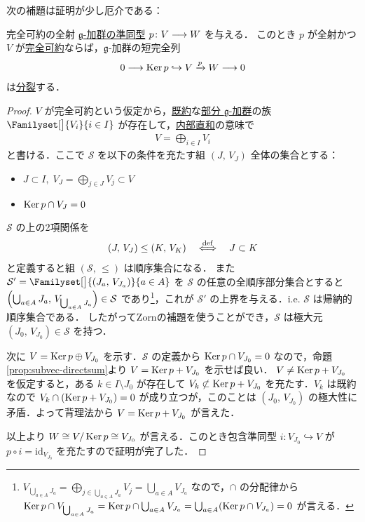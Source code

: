 \documentclass[rep_main]{subfiles}
\begin{document}
次の補題は証明が少し厄介である：
\begin{mylem}[label=lem:semisimple-split]{完全可約の全射}
	\hyperref[def:g-module-hom]{$\mathfrak{g}$-加群の準同型} $p \colon V \longrightarrow W$ を与える．
	このとき $p$ が全射かつ $V$ が\hyperref[def:irr]{完全可約}ならば，$\mathfrak{g}$-加群の短完全列
	\begin{align}
		0 \longrightarrow \operatorname{Ker} p \hookrightarrow V \xrightarrow{p} W \longrightarrow 0
	\end{align}
	は\hyperref[lem:splitting]{分裂}する．
\end{mylem}

\begin{proof}
	$V$ が完全可約という仮定から，\hyperref[def:irr]{既約}な\hyperref[def:sub-g-module]{部分 $\mathfrak{g}$-加群}の族 $\Familyset[\big]{V_i}{i \in I}$ が存在して，\hyperref[col:subvec-directsum]{内部直和}の意味で
	\begin{align}
		V = \bigoplus_{i \in I} V_i
	\end{align}
	と書ける．ここで $\mathcal{S}$ を以下の条件を充たす組 $(J,\, V_J)$ 全体の集合とする：
	\begin{itemize}
		\item $J \subset I,\; V_J = \bigoplus_{j \in J} V_j \subset V$
		\item $\operatorname{Ker} p \cap V_J = 0$
	\end{itemize}
	$\mathcal{S}$ の上の2項関係を
	\begin{align}
		(J,\, V_J) \le (K,\, V_K) \quad\stackrel{\mathrm{def}}{\Longleftrightarrow}\quad J \subset K
	\end{align}
	と定義すると組 $(\mathcal{S},\, \le)$ は順序集合になる．
	また $\mathcal{S}' = \Familyset[\big]{(J_a,\, V_{J_a})}{a \in A}$ を $\mathcal{S}$ の任意の全順序部分集合とすると $\Bigl(\bigcup_{a\in A} J_a,\, V_{\bigcup_{a \in A} J_a}\Bigr) \in \mathcal{S}$ であり\footnote{$V_{\bigcup_{a \in A} J_a} = \bigoplus_{j \in \bigcup_{a \in A} J_a} V_j = \bigcup_{a \in A} V_{J_a}$ なので，$\cap$ の分配律から $\operatorname{Ker} p \cap V_{\bigcup_{a \in A} J_a} = \operatorname{Ker} p \cap \bigcup_{a \in A} V_{J_a} = \bigcup_{a \in A} (\operatorname{Ker} p \cap V_{J_a}) = 0$ が言える．}，これが $\mathcal{S}'$ の上界を与える．i.e. $\mathcal{S}$ は帰納的順序集合である．
	したがってZornの補題を使うことができ，$\mathcal{S}$ は極大元 $(J_0,\, V_{J_0}) \in \mathcal{S}$ を持つ．

	次に $V = \operatorname{Ker} p \oplus V_{J_0}$ を示す．$\mathcal{S}$ の定義から $\operatorname{Ker} p \cap V_{J_0} = 0$ なので，命題\ref{prop:subvec-directsum}より $V = \operatorname{Ker} p + V_{J_0}$ を示せば良い．
	$V \neq \operatorname{Ker} p + V_{J_0}$ を仮定すると，ある $k \in I \setminus J_0$ が存在して $V_k \not\subset \operatorname{Ker} p + V_{J_0}$ を充たす．$V_k$ は既約なので $V_k \cap (\operatorname{Ker} p + V_{J_0}) = 0$ が成り立つが，このことは $(J_0,\, V_{J_0})$ の極大性に矛盾．よって背理法から $V = \operatorname{Ker} p + V_{J_0}$ が言えた．

	以上より $W \cong V / \operatorname{Ker} p \cong V_{J_0}$ が言える．このとき包含準同型 $i \colon V_{J_0} \hookrightarrow V$ が $p \circ i = \mathrm{id}_{V_{J_0}}$ を充たすので証明が完了した．
\end{proof}
\end{document}
